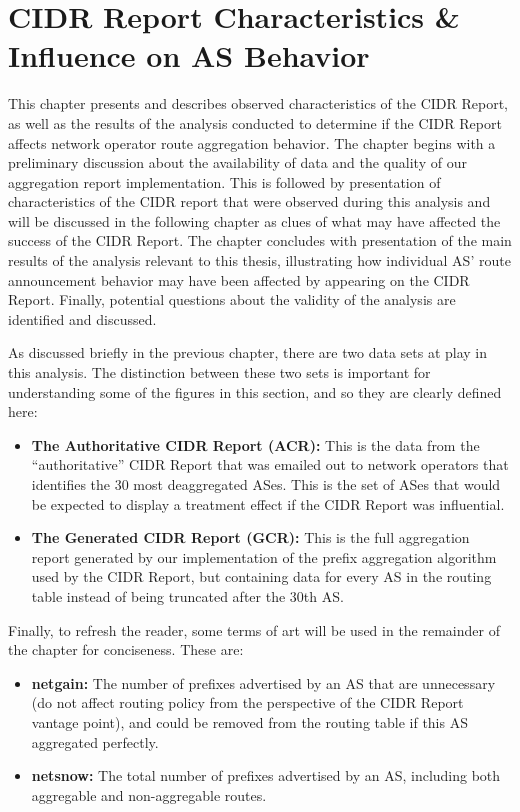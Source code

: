 \chapter{CIDR Report Characteristics \& Influence on AS Behavior}
\label{chap:analysis}

This chapter presents and describes observed characteristics of the CIDR Report,
as well as the results of the analysis conducted to determine if the CIDR Report
affects network operator route aggregation behavior. The chapter begins with
a preliminary discussion about the availability of data and the quality of our
aggregation report implementation. This is followed by presentation of
characteristics of the CIDR report that were observed during this analysis and
will be discussed in the following chapter as clues of what may have affected
the success of the CIDR Report. The chapter concludes with presentation of the
main results of the analysis relevant to this thesis, illustrating how
individual AS' route announcement behavior may have been affected by appearing
on the CIDR Report. Finally, potential questions about the validity of the
analysis are identified and discussed.

As discussed briefly in the previous chapter, there are two data sets at play in
this analysis. The distinction between these two sets is important for
understanding some of the figures in this section, and so they are clearly
defined here:
\begin{itemize}
\item{\textbf{The Authoritative CIDR Report (ACR):} This is the data from the
``authoritative'' CIDR Report that was emailed out to network operators that
identifies the 30 most deaggregated ASes. This is the set of ASes that would be
expected to display a treatment effect if the CIDR Report was influential.}
\item{\textbf{The Generated CIDR Report (GCR):} This is the full aggregation
report generated by our implementation of the prefix aggregation algorithm used
by the CIDR Report, but containing data for every AS in the routing table
instead of being truncated after the 30th AS.}
\end{itemize}

Finally, to refresh the reader, some terms of art will be used in the remainder
of the chapter for conciseness. These are:
\begin{itemize}
\item{\textbf{netgain:} The number of prefixes advertised by an AS that are
unnecessary (do not affect routing policy from the perspective of the CIDR
Report vantage point), and could be removed from the routing table if this AS
aggregated perfectly.}
\item{\textbf{netsnow:} The total number of prefixes advertised by an AS,
including both aggregable and non-aggregable routes.}
\end{itemize}

